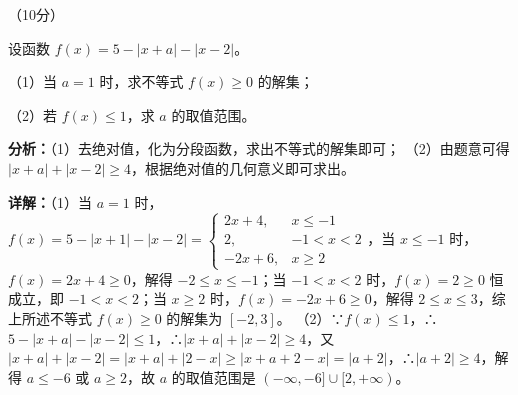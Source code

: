 \begin{question}[points=10]
[选修4-5：不等式选讲]（10分）

设函数 $f(x)=5-|x+a|-|x-2|$。

（1）当 $a=1$ 时，求不等式 $f(x)\geq0$ 的解集；

（2）若 $f(x)\leq1$，求 $a$ 的取值范围。
\begin{solution}

\textbf{分析：}（1）去绝对值，化为分段函数，求出不等式的解集即可；
（2）由题意可得 $|x+a|+|x-2|\geq4$，根据绝对值的几何意义即可求出。

\textbf{详解：}（1）当 $a=1$ 时，$f(x)=5-|x+1|-|x-2|=\begin{cases} 2x+4, & x\leq-1 \\ 2, & -1<x<2 \\ -2x+6, & x\geq2 \end{cases}$，当 $x\leq-1$ 时，$f(x)=2x+4\geq0$，解得 $-2\leq x\leq-1$；当 $-1<x<2$ 时，$f(x)=2\geq0$ 恒成立，即 $-1<x<2$；当 $x\geq2$ 时，$f(x)=-2x+6\geq0$，解得 $2\leq x\leq3$，综上所述不等式 $f(x)\geq0$ 的解集为 $[-2,3]$。
（2）∵$f(x)\leq1$，∴$5-|x+a|-|x-2|\leq1$，∴$|x+a|+|x-2|\geq4$，又 $|x+a|+|x-2|=|x+a|+|2-x|\geq|x+a+2-x|=|a+2|$，∴$|a+2|\geq4$，解得 $a\leq-6$ 或 $a\geq2$，故 $a$ 的取值范围是 $(-\infty,-6]\cup[2,+\infty)$。
\end{solution}
\end{question}

